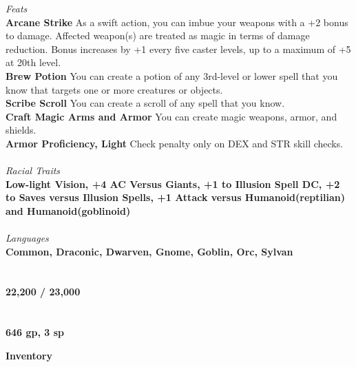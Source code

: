\documentclass[letterpaper]{article}
\begin{document}
\noindent\emph{Feats} \\
\noindent\textbf{Arcane Strike} As a swift action, you can imbue your weapons with a +2 bonus to damage.  Affected weapon(s) are treated as magic in terms of damage reduction.  Bonus increases by +1 every five caster levels, up to a maximum of +5 at 20th level. \\
\noindent\textbf{Brew Potion} You can create a potion of any 3rd-level or lower spell that you know that targets one or more creatures or objects. \\
\noindent\textbf{Scribe Scroll} You can create a scroll of any spell that you know. \\
\noindent\textbf{Craft Magic Arms and Armor} You can create magic weapons, armor, and shields. \\
\noindent\textbf{Armor Proficiency, Light} Check penalty only on {\footnotesize DEX} and {\footnotesize STR} skill checks. \\
\\
\noindent\emph{Racial Traits} \\
\textbf{Low-light Vision, +4 AC Versus Giants, +1 to Illusion Spell DC, +2 to Saves versus Illusion Spells, +1 Attack versus Humanoid(reptilian) and Humanoid(goblinoid)} \\
\\
\noindent\emph{Languages} \\
\textbf{Common, Draconic, Dwarven, Gnome, Goblin, Orc, Sylvan} \\
\\
 \\
\textbf{22,200 / 23,000} \\
\\
 \\
\textbf{646 gp, 3 sp} \\

\pagebreak

\noindent \textbf{\huge{Inventory}} \\
\end{document}
